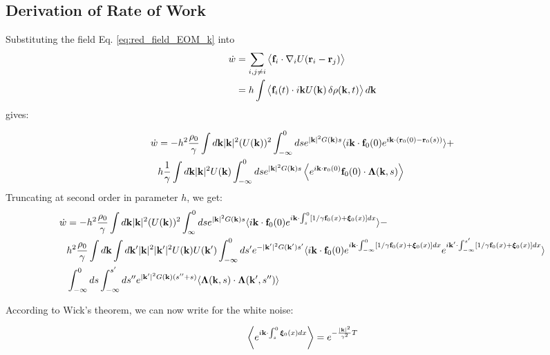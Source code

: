 \documentclass[superscriptaddress, amsmath,preprintnumbers,10pt,article,notitlepage]{revtex4-1}
\newcommand{\U}{U}
\begin{document}
\subsection{Derivation of Rate of Work}

Substituting the field Eq. \ref{eq:red_field_EOM_k} into
\begin{align}\label{eq:wdot}
    \dot{w} & = \sum_{i, j\neq i} \big\langle {\bf f}_i \cdot \nabla_i U({\bf r}_i-{\bf r}_j) \big\rangle \nonumber \\
    & = h \int \big\langle {\bf f}_i(t) \cdot i{\bf k} \U({\bf k}) \,\delta \rho({\bf k}, t) \big\rangle \,d{\bf k} 
\end{align}
gives:

\begin{align}
\dot{w} & =  -h^2\dfrac{\rho_0}{\gamma} \int d{\bf k} |{\bf k}|^2 (U({\bf k}))^2  \int
_{-\infty}^0 ds e^{|{\bf k}|^2 G({\bf k})s} \langle i{\bf k} \cdot {\bf f}_0(0) e^{i{\bf k}\cdot ({\bf r}_0(0) - {\bf r}_0(s))}\rangle + \nonumber \\
& h\dfrac{1}{\gamma} \int d{\bf k} |{\bf k}|^2 U({\bf k})  \int
_{-\infty}^0 ds e^{|{\bf k}|^2 G({\bf k})s} \left \langle e^{i{\bf k}\cdot {\bf r}_0(0)} {\bf f}_0(0) \cdot  {\bm \Lambda}({\bf k}, s)\right \rangle 
\end{align}
Truncating at second order in parameter $h$, we get:
\begin{align}
\dot{w} & =  -h^2\dfrac{\rho_0}{\gamma}   \int d{\bf k} |{\bf k}|^2 (U({\bf k}))^2 \int_{\infty}^0 ds e^{|{\bf k}|^2 G({\bf k})s}  \langle i{\bf k} \cdot {\bf f}_0(0)   e^{i{\bf k}\cdot \int_s^0 [1/\gamma {\bf f}_0(x) + {\bm \xi}_0(x)] dx}  \rangle - \nonumber \\
&  h^2 \dfrac{\rho_0}{\gamma}  \int d{\bf k} \int d{\bf k}' |{\bf k}|^2 |{\bf k}'|^2 U({\bf k}) U({\bf k}') \int_{-\infty}^0 ds' e^{- |{\bf k}'|^2 G({\bf k}') s'}  \langle  i{\bf k} \cdot {\bf f}_0(0) e^{i{\bf k}\cdot \int_{-\infty}^0 [1/\gamma {\bf f}_0(x) + {\bm \xi}_0(x) ]dx}  e^{i{\bf k}'\cdot \int_{-\infty}^{s'} [1/\gamma {\bf f}_0(x) + {\bm \xi}_0(x)] dx}    \rangle \nonumber \\
& \int_{-\infty}^{0} ds  \int_{-\infty}^{s'} ds'' e^{ |{\bf k}'|^2 G({\bf k}) (s''+s)}  \langle {\bm \Lambda}({\bf k}, s) \cdot {\bm \Lambda({\bf k}', s'')}\rangle
\end{align}


According to Wick's theorem, we can now write for the white noise:

\begin{equation}\label{eq:expxi}
\left \langle e^{i{\bf k}\cdot \int_{s}^0 {\bm \xi}_0(x) dx} \right\rangle =e^{-\frac{|{\bf k}|^2}{\gamma^2} T} 
\end{equation}
\end{document}
